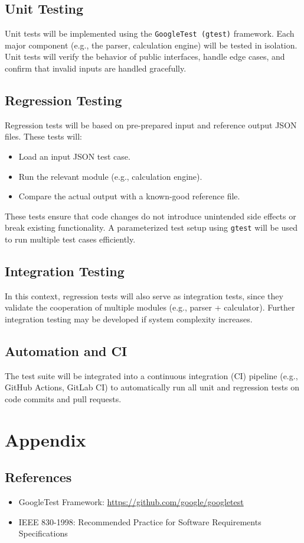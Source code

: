 \documentclass[a4paper,11pt]{article}
\begin{document}
	\subsection{Unit Testing}
	Unit tests will be implemented using the \texttt{GoogleTest (gtest)} framework. Each major component (e.g., the parser, calculation engine) will be tested in isolation. Unit tests will verify the behavior of public interfaces, handle edge cases, and confirm that invalid inputs are handled gracefully.
	
	\subsection{Regression Testing}
	Regression tests will be based on pre-prepared input and reference output JSON files. These tests will:
	\begin{itemize}
		\item Load an input JSON test case.
		\item Run the relevant module (e.g., calculation engine).
		\item Compare the actual output with a known-good reference file.
	\end{itemize}
	
	These tests ensure that code changes do not introduce unintended side effects or break existing functionality. A parameterized test setup using \texttt{gtest} will be used to run multiple test cases efficiently.
	
	\subsection{Integration Testing}
	In this context, regression tests will also serve as integration tests, since they validate the cooperation of multiple modules (e.g., parser + calculator). Further integration testing may be developed if system complexity increases.
	
	\subsection{Automation and CI}
	The test suite will be integrated into a continuous integration (CI) pipeline (e.g., GitHub Actions, GitLab CI) to automatically run all unit and regression tests on code commits and pull requests.
	
	\section{Appendix}
	\subsection{References}
	\begin{itemize}
		\item GoogleTest Framework: \url{https://github.com/google/googletest}
		\item IEEE 830-1998: Recommended Practice for Software Requirements Specifications
	\end{itemize}
	
\end{document}
